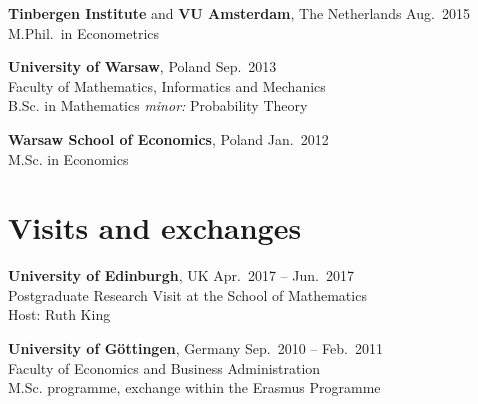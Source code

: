 \documentclass[margin,line]{resume}
\begin{document}
\begin{resume}
    \textbf{Tinbergen Institute} and \textbf{VU Amsterdam}, The Netherlands  \hfill Aug.\ 2015 	\\
	M.Phil.\ in Econometrics
	\vspace{-2mm}

	\textbf{University of Warsaw}, Poland  \hfill Sep.\ 2013 	\\
	Faculty of Mathematics, Informatics and Mechanics \\B.Sc. in Mathematics		\textit{minor:} Probability Theory 
\vspace{-2mm}

	\textbf{Warsaw School of Economics}, Poland   \hfill  Jan.\ 2012\\
	M.Sc. in Economics\\ %
%

\vspace{-5mm}
    
\section{\mysidestyle Visits and exchanges}   
    \textbf{University of Edinburgh},  UK \hfill Apr.\ 2017 -- Jun.\ 2017\\
	Postgraduate Research Visit at the School of Mathematics\\ 
    Host: Ruth King
  
    \vspace{-1mm}

	\textbf{University of G{\"o}ttingen}, Germany   \hfill Sep.\ 2010 -- Feb.\ 2011	\\
    Faculty of Economics and Business Administration \\M.Sc. programme, exchange within the Erasmus Programme
        


\end{resume}
\end{document}
